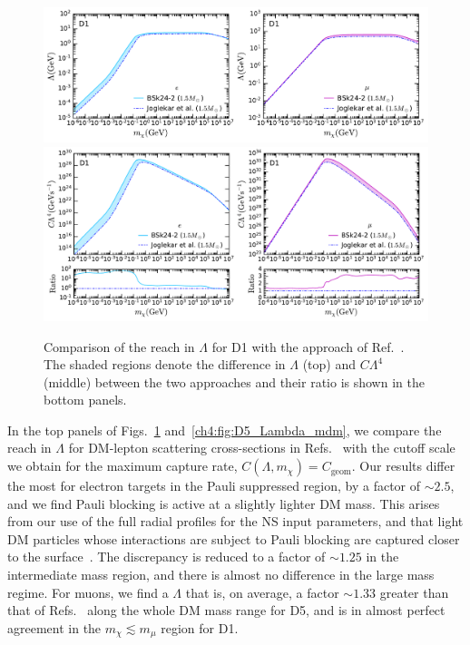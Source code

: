 \begin{figure}[t!bp]
    \centering
    \includegraphics[width=\textwidth]{capture_2/D1_Lambda_mdm_leptons.pdf}\\
    \vspace*{-0.5em}    
    \includegraphics[width=\textwidth]{capture_2/D1_C_mdm_leptons.pdf}     
    \caption[Comparison of the reach in $\Lambda$ for D1 with the approach of Ref.~\cite{Joglekar:2020liw_Darkkineticheating}. ]{Comparison of the reach in $\Lambda$ for D1 with the approach of Ref.~\cite{Joglekar:2020liw_Darkkineticheating}. The shaded regions denote the difference in $\Lambda$ (top) and $C\Lambda^4$ (middle) between the two approaches and their ratio is shown in the bottom panels.}
    \label{ch4:fig:D1_Lambda_mdm}
\end{figure}


    
In the top panels of Figs.~\ref{ch4:fig:D1_Lambda_mdm} and~\ref{ch4:fig:D5_Lambda_mdm}, we compare the reach in $\Lambda$ for DM-lepton scattering cross-sections in Refs.~\cite{Joglekar:2019vzy_sep_Relativisticcapturedark,Joglekar:2020liw_Darkkineticheating} with the cutoff scale we obtain for the maximum capture rate, $C(\Lambda,m_\chi)=C_\mathrm{geom}$. 
Our results differ the most for electron targets in the Pauli suppressed region, by a factor of $\sim 2.5$, and we find Pauli blocking is active at a slightly lighter DM mass. This arises from our use of the full radial profiles for the NS input parameters, and that light DM particles whose interactions are subject to Pauli blocking are captured closer to the surface~\cite{Bell:2020jou_sep_ImprovedTreatmentDark}. The discrepancy is reduced to a factor of  $\sim 1.25$ in the intermediate mass region, and there is almost no difference in the large mass regime. For muons, we find a $\Lambda$ that is, on average, a factor $\sim 1.33$ greater than that of Refs.~\cite{Joglekar:2019vzy_sep_Relativisticcapturedark,Joglekar:2020liw_Darkkineticheating} along the whole DM mass range for D5,  and is in almost perfect agreement in the $m_\chi\lesssim m_\mu$ region for D1. 


